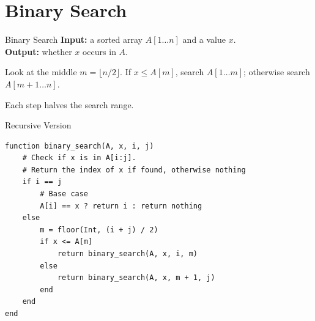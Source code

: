 \documentclass[10pt,aspectratio=169]{beamer}
\begin{document}
\section{Binary Search}

\begin{frame}{Binary Search}
  \textbf{Input:} a \alert{sorted} array $A[1 \ldots n]$ and a value $x$.\\
  \textbf{Output:} whether $x$ occurs in $A$.

  \bigskip
  Look at the middle $m = \lfloor n/2 \rfloor$. If $x \le A[m]$, search $A[1 \ldots m]$; otherwise search $A[m+1 \ldots n]$.

  \bigskip
  \begin{center}
  \end{center}

  \bigskip
  \begin{center}
    Each step \alert{halves} the search range.
  \end{center}
\end{frame}

\begin{frame}[fragile]{Recursive Version}
  \begin{lstlisting}
function binary_search(A, x, i, j)
    # Check if x is in A[i:j].
    # Return the index of x if found, otherwise nothing
    if i == j
        # Base case
        A[i] == x ? return i : return nothing
    else
        m = floor(Int, (i + j) / 2)
        if x <= A[m]
            return binary_search(A, x, i, m)
        else
            return binary_search(A, x, m + 1, j)
        end
    end
end
  \end{lstlisting}
\end{frame}
\end{document}
